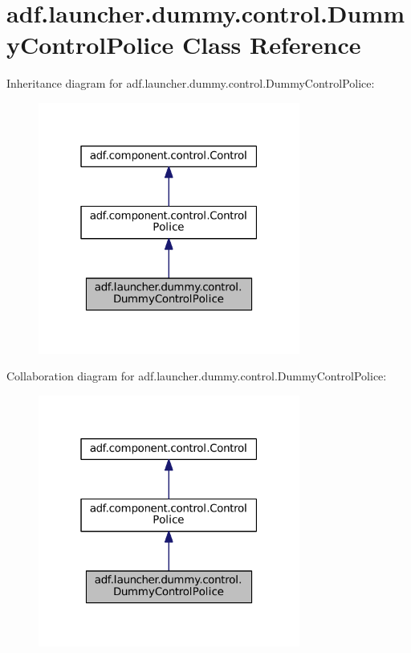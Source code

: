 \hypertarget{classadf_1_1launcher_1_1dummy_1_1control_1_1DummyControlPolice}{}\section{adf.\+launcher.\+dummy.\+control.\+Dummy\+Control\+Police Class Reference}
\label{classadf_1_1launcher_1_1dummy_1_1control_1_1DummyControlPolice}


Inheritance diagram for adf.\+launcher.\+dummy.\+control.\+Dummy\+Control\+Police\+:
\nopagebreak
\begin{figure}[H]
\begin{center}
\leavevmode
\includegraphics[width=244pt]{classadf_1_1launcher_1_1dummy_1_1control_1_1DummyControlPolice__inherit__graph}
\end{center}
\end{figure}


Collaboration diagram for adf.\+launcher.\+dummy.\+control.\+Dummy\+Control\+Police\+:
\nopagebreak
\begin{figure}[H]
\begin{center}
\leavevmode
\includegraphics[width=244pt]{classadf_1_1launcher_1_1dummy_1_1control_1_1DummyControlPolice__coll__graph}
\end{center}
\end{figure}
